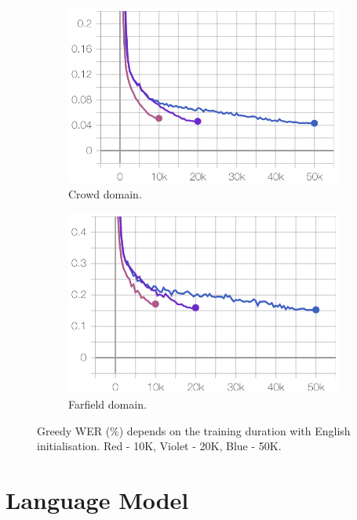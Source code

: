 \documentclass[a4paper]{article}
\begin{document}
\begin{figure}[ht]
\begin{subfigure}{.49\linewidth}
  \centering
  \includegraphics[width=1.\linewidth]{LaTeX/img/crowd_5.095_4.629_4.327_en.png}  
  \caption{Crowd domain.}
  \label{fig:wer_steps1}
\end{subfigure}
\begin{subfigure}{.49\linewidth}
  \centering
  \includegraphics[width=1.\linewidth]{LaTeX/img/portal_17.13_15.95_15.28_en.png}  
  \caption{Farfield domain.}
  \label{fig:wer_steps2}
\end{subfigure}
\caption{Greedy WER (\%) depends on the training duration with English initialisation. Red - 10K, Violet - 20K, Blue - 50K. }
\label{fig:wer_steps}
\end{figure}

\section{Language Model}
\end{document}
